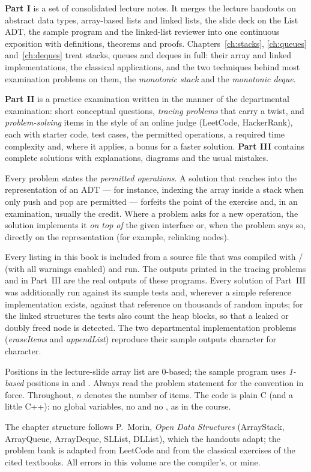 \textbf{Part I} is a set of consolidated lecture notes. It merges the lecture handouts on
abstract data types, array-based lists and linked lists, the slide deck on the List ADT,
the sample program  and the linked-list reviewer into one continuous
exposition with definitions, theorems and proofs. Chapters~\ref{ch:stacks},
\ref{ch:queues} and~\ref{ch:deques} treat stacks, queues and deques in full: their
array and linked implementations, the classical applications, and the two techniques
behind most examination problems on them, the \emph{monotonic stack} and the
\emph{monotonic deque}.

\textbf{Part II} is a practice examination written in the manner of the departmental
examination: short conceptual questions, \emph{tracing problems} that carry a twist, and
\emph{problem-solving} items in the style of an online judge (LeetCode, HackerRank),
each with starter code, test cases, the permitted operations, a required time complexity
and, where it applies, a bonus for a faster solution. \textbf{Part III} contains complete
solutions with explanations, diagrams and the usual mistakes.

 Every problem states the \emph{permitted operations}. A
solution that reaches into the representation of an ADT --- for instance, indexing the
array inside a stack when only push and pop are permitted --- forfeits the point of the
exercise and, in an examination, usually the credit. Where a problem asks for a new
operation, the solution implements it \emph{on top of} the given interface or, when the
problem says so, directly on the representation (for example, relinking nodes).

 Every listing in this book is included from a source file that was
compiled with / (with all warnings enabled) and run. The outputs printed
in the tracing problems and in Part~III are the real outputs of these programs. Every
solution of Part~III was additionally run against its sample tests and, wherever a simple
reference implementation exists, against that reference on thousands of random inputs;
for the linked structures the tests also count the heap blocks, so that a leaked or
doubly freed node is detected. The two departmental implementation problems
(\emph{eraseItems} and \emph{appendList}) reproduce their sample outputs character for
character.

 Positions in the lecture-slide array list are 0-based; the sample
program  uses \emph{1-based} positions in  and .
Always read the problem statement for the convention in force. Throughout, $n$ denotes
the number of items. The code is plain C (and a little C++): no global variables, no
 and no , as in the course.

 The chapter structure follows P.~Morin, \emph{Open Data Structures}
(ArrayStack, ArrayQueue, ArrayDeque, SLList, DLList), which the handouts adapt;
the problem bank is adapted from LeetCode and from the classical exercises of the cited
textbooks. All errors in this volume are the compiler's, or mine.

\tableofcontents
